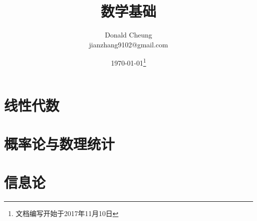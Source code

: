 \def\mathnotes{}
\ifx\notes\undefined
    \providecommand{\notesroot}{..}
    \providecommand{\mathroot}{.}

    \title{数学基础}
    \author{Donald Cheung\\jianzhang9102@gmail.com}
    \date{\today\footnote{文档编写开始于2017年11月10日}}

    
\else
    \providecommand{\mathroot}{\notesroot/math}
\fi



\chapter{线性代数}

\chapter{概率论与数理统计}

\chapter{信息论}

\ifx\notes\undefined
    
\fi
